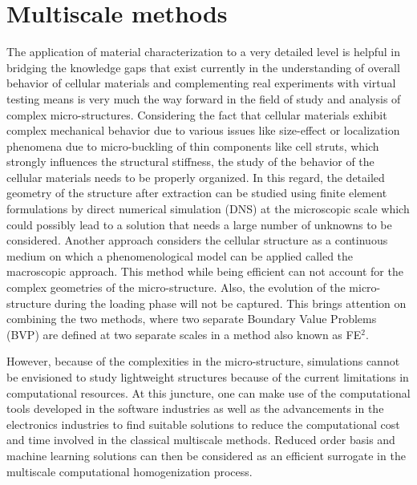 \section{Multiscale methods}
The application of material characterization to a very detailed level is helpful in bridging the knowledge gaps that exist currently in the understanding of overall behavior of cellular materials and complementing real experiments with virtual testing means is very much the way forward in the field of study and analysis of complex micro-structures. Considering the fact that cellular materials exhibit complex mechanical behavior due to various issues like size-effect\cite{andrewsCompressiveTensileBehaviour1999} or localization phenomena due to micro-buckling of thin components like cell struts\cite{jangCrushingAluminumOpencell2009}, which strongly influences the structural stiffness, the study of the behavior of the cellular materials needs to be properly organized. In this regard, the detailed geometry of the structure after extraction can be studied using finite element formulations by direct numerical simulation (DNS) at the microscopic scale \cite{mangipudiMultiscaleModellingDamage2011,gibsonCellularSolidsStructure1997} which could possibly lead to a solution that needs a large number of unknowns to be considered. Another approach considers the cellular structure as a continuous medium on which a phenomenological model can be applied\cite{forestContinuumModelingStrain2005} called the macroscopic approach. This method while being efficient can not account for the complex geometries of the micro-structure. Also, the evolution of the micro-structure during the loading phase will not be captured. This brings attention on combining the two methods, where two separate Boundary Value Problems (BVP) are defined at two separate scales in a method also known as FE$ ^2 $. 

However, because of the complexities in the micro-structure, \fee simulations cannot be envisioned to study lightweight structures because of the current limitations in computational resources. 
At this juncture, one can make use of the computational tools developed in the software industries as well as the advancements in the electronics industries to find suitable solutions to reduce the computational cost and time involved in the classical multiscale methods. Reduced order basis and machine learning solutions can then be considered as an efficient surrogate in the multiscale computational homogenization process.

